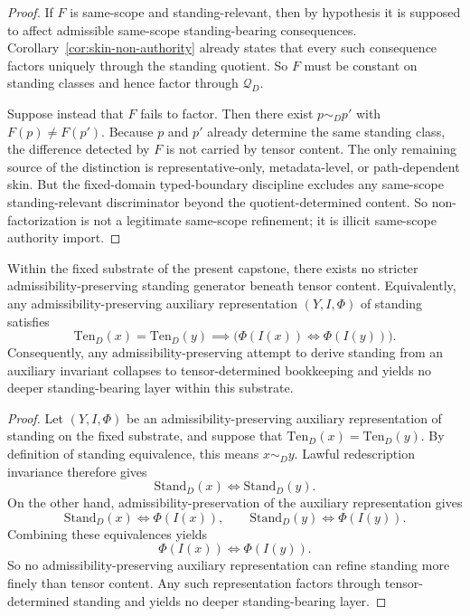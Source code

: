 \begin{proof}
If $F$ is same-scope and standing-relevant, then by hypothesis it is supposed to affect admissible same-scope standing-bearing consequences. Corollary~\ref{cor:skin-non-authority} already states that every such consequence factors uniquely through the standing quotient. So $F$ must be constant on standing classes and hence factor through $\mathcal Q_D$.

Suppose instead that $F$ fails to factor. Then there exist $p\sim_D p'$ with $F(p)\neq F(p')$. Because $p$ and $p'$ already determine the same standing class, the difference detected by $F$ is not carried by tensor content. The only remaining source of the distinction is representative-only, metadata-level, or path-dependent skin. But the fixed-domain typed-boundary discipline excludes any same-scope standing-relevant discriminator beyond the quotient-determined content. So non-factorization is not a legitimate same-scope refinement; it is illicit same-scope authority import.\cite{MaleyATS,MaleyExhaustion}
\end{proof}

\begin{theorem}
\label{thm:no-stricter-standing-refinement}
Within the fixed substrate of the present capstone, there exists no stricter admissibility-preserving standing generator beneath tensor content. Equivalently, any admissibility-preserving auxiliary representation $(Y,I,\Phi)$ of standing satisfies
\[
\mathrm{Ten}_D(x)=\mathrm{Ten}_D(y) \implies \bigl(\Phi(I(x)) \iff \Phi(I(y))\bigr).
\]
Consequently, any admissibility-preserving attempt to derive standing from an auxiliary invariant collapses to tensor-determined bookkeeping and yields no deeper standing-bearing layer within this substrate.
\end{theorem}

\begin{proof}
Let $(Y,I,\Phi)$ be an admissibility-preserving auxiliary representation of standing on the fixed substrate, and suppose that $\mathrm{Ten}_D(x)=\mathrm{Ten}_D(y)$. By definition of standing equivalence, this means $x\sim_D y$. Lawful redescription invariance therefore gives
\[
\mathrm{Stand}_D(x) \iff \mathrm{Stand}_D(y).
\]
On the other hand, admissibility-preservation of the auxiliary representation gives
\[
\mathrm{Stand}_D(x) \iff \Phi(I(x)), \qquad \mathrm{Stand}_D(y) \iff \Phi(I(y)).
\]
Combining these equivalences yields
\[
\Phi(I(x)) \iff \Phi(I(y)).
\]
So no admissibility-preserving auxiliary representation can refine standing more finely than tensor content. Any such representation factors through tensor-determined standing and yields no deeper standing-bearing layer.\cite{MaleyTrajectory}
\end{proof}

